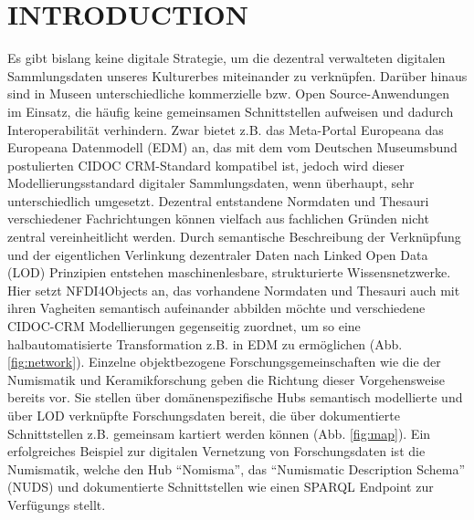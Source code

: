\documentclass[9pt,academicons]{article}
\begin{document}
\noindent


\section{INTRODUCTION}
Es gibt bislang keine digitale Strategie, um die dezentral verwalteten digitalen Sammlungsdaten unseres Kulturerbes miteinander zu verknüpfen. Darüber hinaus sind in Museen unterschiedliche kommerzielle bzw. Open Source-Anwendungen im Einsatz, die häufig keine gemeinsamen Schnittstellen aufweisen und dadurch Interoperabilität verhindern. Zwar bietet z.B. das Meta-Portal Europeana das Europeana Datenmodell (EDM) an, das mit dem vom Deutschen Museumsbund postulierten CIDOC CRM-Standard kompatibel ist, jedoch wird dieser Modellierungsstandard digitaler Sammlungsdaten, wenn überhaupt, sehr unterschiedlich umgesetzt. Dezentral entstandene Normdaten und Thesauri verschiedener Fachrichtungen können vielfach aus fachlichen Gründen nicht zentral vereinheitlicht werden. Durch semantische Beschreibung der Verknüpfung und der eigentlichen Verlinkung dezentraler Daten nach Linked Open Data (LOD) Prinzipien entstehen maschinenlesbare, strukturierte Wissensnetzwerke. Hier setzt NFDI4Objects an, das vorhandene Normdaten und Thesauri auch mit ihren Vagheiten semantisch aufeinander abbilden möchte und verschiedene CIDOC-CRM Modellierungen gegenseitig zuordnet, um so eine halbautomatisierte Transformation z.B. in EDM zu ermöglichen (Abb. \ref{fig:network}). Einzelne objektbezogene Forschungsgemeinschaften wie die der Numismatik und Keramikforschung geben die Richtung dieser Vorgehensweise bereits vor. Sie stellen über domänenspezifische Hubs semantisch modellierte und über LOD verknüpfte Forschungsdaten bereit, die über dokumentierte Schnittstellen z.B. gemeinsam kartiert werden können (Abb. \ref{fig:map}). Ein erfolgreiches Beispiel zur digitalen Vernetzung von Forschungsdaten ist die Numismatik, welche den Hub “Nomisma”, das “Numismatic Description Schema” (NUDS) und dokumentierte Schnittstellen wie einen SPARQL Endpoint zur Verfügungs stellt.\\\\\\
\end{document}
